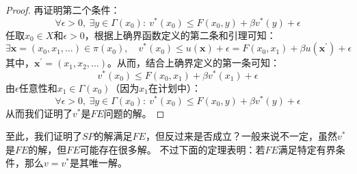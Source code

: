 \begin{proof}
    再证明第二个条件：
    \begin{equation*}
        \forall \epsilon > 0, ~\exists y\in \Gamma\left(x_0\right): 
            ~v^*\left(x_0\right)\leq F\left(x_0,y\right) + \beta v^*\left(y\right) + \epsilon
    \end{equation*}
    任取$x_0\in X$和$\epsilon>0$，根据上确界函数定义的第二条和引理可知：
    \begin{equation*}
        \exists \boldsymbol{x}=\left(x_0,x_1,\dots\right)\in \pi\left(x_0\right), 
            \quad v^*\left(x_0\right)\leq u\left(\boldsymbol{x}\right)+\epsilon 
                = F\left(x_0,x_1\right)+\beta u\left(\boldsymbol{x}^{\prime}\right)+\epsilon
    \end{equation*}
    其中，$\boldsymbol{x}^{\prime}= \left(x_1,x_2,\dots\right)$。从而，结合上确界定义的第一条可知：
    \begin{equation*}
        v^*\left(x_0\right)\leq F\left(x_0,x_1\right)+\beta v^*\left(x_1\right)+\epsilon 
    \end{equation*}
    由$\epsilon$任意性和$x_1\in\Gamma\left(x_0\right)$（因为$x_1$在计划中）：
    \begin{equation*}
        \forall \epsilon > 0, ~\exists y\in \Gamma\left(x_0\right): 
            ~v^*\left(x_0\right)\leq F\left(x_0,y\right) + \beta v^*\left(y\right) + \epsilon
    \end{equation*}
    从而我们证明了$v^*$是$FE$问题的解。
\end{proof}

至此，我们证明了$SP$的解满足$FE$，但反过来是否成立？一般来说不一定，虽然$v^*$是$FE$的解，但$FE$可能存在很多解。
不过下面的定理表明：若$FE$满足特定有界条件，那么$v=v^*$是其唯一解。

